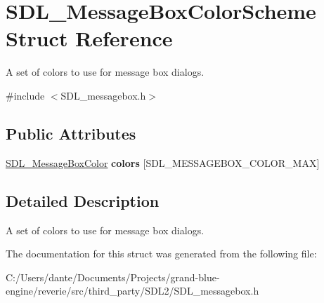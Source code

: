 \hypertarget{struct_s_d_l___message_box_color_scheme}{}\section{S\+D\+L\+\_\+\+Message\+Box\+Color\+Scheme Struct Reference}
\label{struct_s_d_l___message_box_color_scheme}


A set of colors to use for message box dialogs.  




{\ttfamily \#include $<$S\+D\+L\+\_\+messagebox.\+h$>$}

\subsection*{Public Attributes}
\begin{DoxyCompactItemize}
\item 
\mbox{\label{struct_s_d_l___message_box_color_scheme_ae3712ec81e41b63b781b7d49d3b3b8f6}} 
\mbox{\hyperlink{struct_s_d_l___message_box_color}{S\+D\+L\+\_\+\+Message\+Box\+Color}} {\bfseries colors} \mbox{[}S\+D\+L\+\_\+\+M\+E\+S\+S\+A\+G\+E\+B\+O\+X\+\_\+\+C\+O\+L\+O\+R\+\_\+\+M\+AX\mbox{]}
\end{DoxyCompactItemize}


\subsection{Detailed Description}
A set of colors to use for message box dialogs. 

The documentation for this struct was generated from the following file\+:\begin{DoxyCompactItemize}
\item 
C\+:/\+Users/dante/\+Documents/\+Projects/grand-\/blue-\/engine/reverie/src/third\+\_\+party/\+S\+D\+L2/S\+D\+L\+\_\+messagebox.\+h\end{DoxyCompactItemize}
